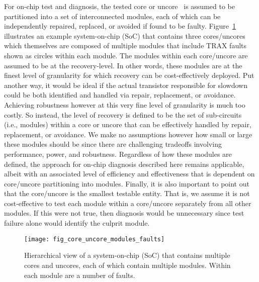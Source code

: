 For on-chip test and diagnosis, the tested core or uncore~\cite{li08, inoue08} is assumed to be partitioned into a set of interconnected modules, each of which can be independently repaired, replaced, or avoided if found to be faulty.
%
Figure~\ref{fig:dict_core_uncore_modules_faults} illustrates an example system-on-chip (SoC) that contains three cores/uncores which themselves are composed of multiple modules that include TRAX faults shown as circles within each module.
%
The modules within each core/uncore are assumed to be at the recovery-level.
%
In other words, these modules are at the finest level of granularity for which recovery can be cost-effectively deployed.
%
Put another way, it would be ideal if the actual transistor responsible for slowdown could be both identified and handled via repair, replacement, or avoidance.
%
Achieving robustness however at this very fine level of granularity is much too costly.
%
So instead, the level of recovery is defined to be the set of sub-circuits (i.e., modules) within a core or uncore that can be effectively handled by repair, replacement, or avoidance.
%
We make no assumptions however how small or large these modules should be since there are challenging tradeoffs involving performance, power, and robustness.
%
Regardless of how these modules are defined, the approach for on-chip diagnosis described here remains applicable, albeit with an associated level of efficiency and effectiveness that is dependent on core/uncore partitioning into modules.
%
Finally, it is also important to point out that the core/uncore is the smallest testable entity.
%
That is, we assume it is not cost-effective to test each module within a core/uncore separately from all other modules.
%
If this were not true, then diagnosis would be unnecessary since test failure alone would identify the culprit module.

\begin{figure}[hbtp]
\centering
\texttt{[image: fig\_core\_uncore\_modules\_faults]}
\caption{Hierarchical view of a system-on-chip (SoC) that contains multiple cores and uncores, each of which contain multiple modules.
%
Within each module are a number of faults.}
\label{fig:dict_core_uncore_modules_faults}
\end{figure}

